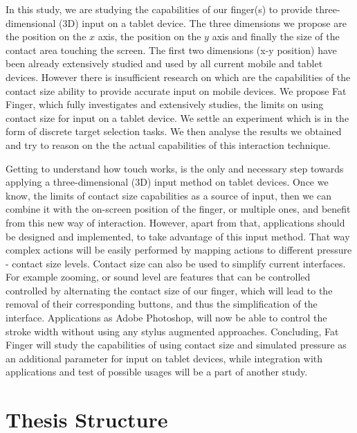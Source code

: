 In this study, we are studying the capabilities of our finger(s) to provide three-dimensional (3D) input on a tablet device. The three dimensions we propose  are the position on the $x$ axis, the position on the $y$ axis and finally the size of the contact area touching the screen. The first two dimensions (x-y position) have been already extensively studied and used by all current mobile and tablet devices. However there is insufficient research on which are the capabilities of the contact size ability to provide accurate input on mobile devices. We propose Fat Finger, which fully investigates and extensively studies, the limits on using contact size for input on a tablet device. We settle an experiment which is in the form of discrete target selection tasks. We then analyse the results we obtained and try to reason on the the actual capabilities of this interaction technique.

Getting to understand how touch works, is the only and necessary step towards applying a three-dimensional (3D) input method on tablet devices. Once we know, the limits of contact size capabilities as a source of input, then we can combine it with the on-screen position of the finger, or multiple ones, and benefit from this new way of interaction. However, apart from that, applications should be designed and implemented, to take advantage of this input method. That way complex actions will be easily performed by mapping actions to different pressure - contact size levels. 
Contact size can also be used to simplify current interfaces. For example zooming, or sound level are features that can be controlled controlled by alternating the contact size of our finger, which will lead to the removal of their corresponding buttons, and thus the simplification of the interface. Applications as Adobe Photoshop, will now be able to control the stroke width without using any stylus augmented approaches. Concluding, Fat Finger will study the capabilities of using contact size and simulated pressure as an additional parameter for input on tablet devices, while integration with applications and test of possible usages will be a part of another study.



\section{Thesis Structure}

